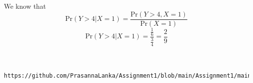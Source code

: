 \documentclass[journal,12pt,twocolumn]{IEEEtran}
\begin{document}
We know that
\begin{equation}
   \text{Pr}(Y>4|X=1)= \frac{\text{Pr}(Y>4,X=1)}{\text{Pr}(X=1)} 
\end{equation}
\begin{equation}
  \text{Pr}(Y>4|X=1)= \frac{\frac{1}{6}}{\frac{3}{4}}=\frac{2}{9}
\end{equation}
\therefore {} \\\\
\begin{lstlisting}
https://github.com/PrasannaLanka/Assignment1/blob/main/Assignment1/main.tex
\end{lstlisting}
\end{document}
